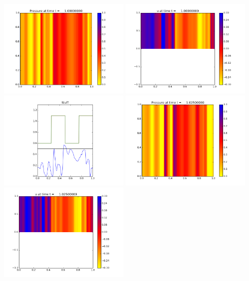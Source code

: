 \documentclass[11pt]{article}
\begin{document}
\vskip 10pt 
\includegraphics[width=0.475\textwidth]{frame0040fig0.png}
\includegraphics[width=0.475\textwidth]{frame0040fig1.png}
\vskip 10pt 
\includegraphics[width=0.475\textwidth]{frame0040fig3.png}
\vskip 10pt 
\includegraphics[width=0.475\textwidth]{frame0041fig0.png}
\includegraphics[width=0.475\textwidth]{frame0041fig1.png}
\end{document}
